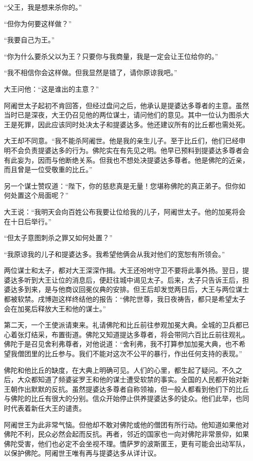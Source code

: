 \documentclass[12pt,twoside,openany]{book}
\begin{document}
“父王，我是想来杀你的。”

“但你为何要这样做？”

“我要自己为王。”

“你为什么要杀父以为王？只要你与我商量，我是一定会让王位给你的。”

“我不相信你会这样做。但我显然是错了，请你原谅我吧。”

大王问他：“这是谁出的主意？”

阿阇世太子起初不肯回答，但经过盘问之后，他承认是提婆达多尊者的主意。虽然当时已是深夜，大王仍召见他的两位谋士，请问他们的意见。其中一位认为图杀大王是死罪，因此应该同时处决太子和提婆达多。他还建议所有的比丘都也需处死。

大王却不同意。“我不能杀阿阇世。他是我的亲生儿子。至于比丘们，他们已经申明不会负责提婆达多的行为。佛陀实在有先见之明。他早已预料到提婆达多尊者会有此妄为，因而与他断绝关系。但我也不想处决提婆达多尊者。他是佛陀的近亲，而且曾是一位受敬重的比丘。”

另一个谋士赞叹道：“陛下，你的慈悲真是无量！您堪称佛陀的真正弟子。但你如何处置这个局面呢？”

大王说：“我明天会向百姓公布我要让位给我的儿子，阿阇世太子。他的加冕将会在十日后举行。”

“但太子意图刺杀之罪又如何处置？”

“我原谅我的儿子和提婆达多。我希望他俩会从我对他们的宽恕有所领会。”

两位谋士和太子，都对大王深深作揖。大王还吩咐守卫不要将此事外扬。翌日，提婆达多听到大王让位的消息后，便赶往城中谒见太子。后来，太子只告诉王后，担婆达多到来，是与他商议回冕仪典的安排。但王后却发觉两日后，大王与两位谋士都被软禁。戌博迦这样终结他的报告：“佛陀世尊，我日夜祷告，都只是希望太子会在加冕后释放大王和他的谋士。”

第二天，一个王使派请柬来。礼请佛陀和比丘前往参观加冕大典。全城的卫兵都已心着张灯结采，布置街道。佛陀又知道提达多尊者，将会带同六百比丘前往观礼。佛陀于是召见舍利弗尊者，对他说道：“舍利弗，我不打算参加加冕大典，也不希望我僧团里的比丘参与。我们不能对这次不公平的暴行，作出任何支持的表现。”

佛陀和他比丘的缺度，在大典上明确可见。人们的心里，都生起了疑问。不久之后，大众都知道了频婆娑罗王和他的谋士遭受软禁的事实。全国的人民都开始对新王朝作出默默的反抗。虽然提婆达多尊者自称领袖，但一般人都看到他们下的比丘与佛陀的比丘有很大的分别。信众开始停止供养提婆达多的徒众。他们此举，也同时代表着新任大王的谴责。

阿阇世王为此非常气恼。但他却不敢对佛陀或他的僧团有所行动。他知道如果他对佛陀不利，民众必然会起而反抗。再者，邻近的国家也一向对佛陀非常景仰，如果佛陀受害，他们也必定不会坐视不理。憍萨罗的波斯匿王，更有可能会出动军队，以保护佛陀。阿阇世王唯有再与提婆达多从详计议。
\end{document}
